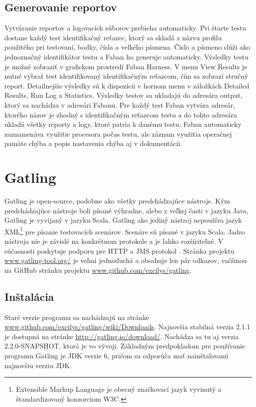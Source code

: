 \documentclass[12pt,oneside,final]{fithesis-utf8}
\begin{document}
\subsection{Generovanie reportov}
Vytváranie reportov a logovacích súborov prebieha automaticky. Pri štarte testu dostane každý test identifikačný reťazec, ktorý sa skladá z názvu profilu použitého pri testovaní, bodky, čísla a velkého písmena. Číslo a písmeno slúži ako jednoznačný identifikátor testu a Faban ho generuje automaticky. Výsledky testu je možné zobraziť v grafickom prostredí Faban Harness. V menu View Results je nutné vybrať test identifikovaný identifikačným reťazcom, čím sa zobrazí stručný report. Detailnejšie výsledky sú k dispozícii v hornom menu v záložkách Detailed Results, Run Log a Statistics. Výsledky testov sa ukladajú do adresára output, ktorý sa nachádza v adresári Fabanu. Pre každý test Faban vytvára adresár, ktorého názov je zhodný s identifikačným reťazcom testu a do tohto adresára ukladá všetky reporty a logy, ktoré patria k danému testu. Faban automaticky zaznamenáva využitie procesora počas testu, ale záznam využitia operačnej pamäte chýba a popis nastavenia chýba aj v dokumentácii.

\newpage
\section{Gatling}
Gatling je open-source, podobne ako všetky predchádzajúce nástroje. Kým predchádzajúce nástroje boli písané výhradne, alebo z veľkej časti v jazyku Java, Gatling je vyvíjaný v jazyku Scala. Gatling ako jediný nástroj nepoužíva jazyk XML\footnote{Extensible Markup Language je obecný značkovací jazyk vyvinutý a štandardizovaný konzorciom W3C.} pre písanie testovacích scenárov. Scenáre sú písané v jazyku Scala. Jadro nástroja nie je závislé na konkrétnom protokole a je ľahko rozšíriteľné. V súčasnosti poskytuje podporu pre HTTP a JMS protokol \cite{Gatling}. Stránka projektu \url{www.gatling-tool.org/} je veľmi jednoduchá a obsahuje len pár odkazov, vačšinou na GitHub stránku projektu \url{www.github.com/excilys/gatling}.

\subsection{Inštalácia}
Staré verzie programu sa nachádzajú na stránke \url{www.github.com/excilys/gatling/wiki/Downloads}. Najnovšia stabilná verzia 2.1.1 je dostupná na stránke \url{http://gatling.io/download/}. Nachádza sa tu aj verzia 2.2.0-SNAPSHOT, ktorá je vo vývoji. Základným predpokladom pre používanie programu Gatling je JDK verzie 6, pričom sa odporúča mať nainštalovanú najnovšiu verziu JDK.
\end{document}
